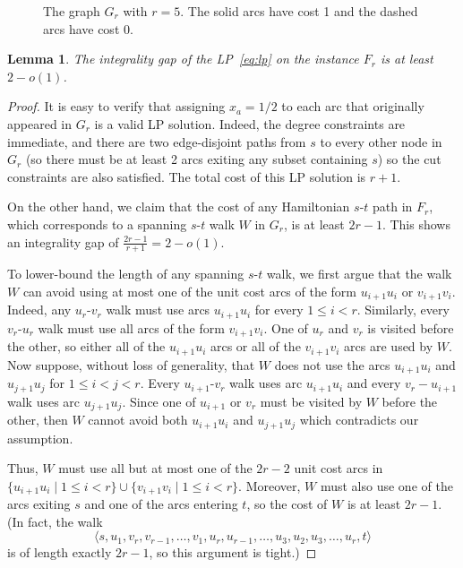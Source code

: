 \documentclass[11pt]{article}
\newtheorem{lemma}[theorem]{Lemma}
\theoremstyle{definition}
\begin{document}
\begin{figure}
 \centering
{}
  \caption{The graph $G_r$ with $r = 5$. The solid arcs have cost 1 and
    the dashed arcs have cost 0.}\label{fig:gap}
\end{figure}

\begin{lemma} \label{lem:intgap}
  The integrality gap of the LP~\ref{eq:lp} on the instance $F_r$ is
  at least $2-o(1)$.
\end{lemma}

\begin{proof}
  It is easy to verify that assigning $x_a = 1/2$ to each arc that originally
  appeared in $G_r$ is a valid LP solution. Indeed, the degree constraints are immediate,
  and there are two edge-disjoint paths from $s$ to every other node in
  $G_r$ (so there must be at least 2 arcs exiting any subset containing $s$)
  so the cut constraints are also satisfied. The total cost of
  this LP solution is $r+1$.

  On the other hand, we claim that the cost of any Hamiltonian $s$-$t$
  path in $F_r$, which corresponds to a spanning $s$-$t$ walk $W$ in
  $G_r$, is at least $2r-1$. This shows an integrality gap of
  $\frac{2r-1}{r+1} = 2 - o(1)$.

  To lower-bound the length of any spanning $s$-$t$ walk, we first argue
  that the walk $W$ can avoid using at most one of the unit cost arcs
  of the form $u_{i+1}u_i$ or $v_{i+1}v_i$. Indeed, any $u_r$-$v_r$ walk
  must use arcs $u_{i+1}u_i$ for every $1 \leq i < r$. Similarly, every
  $v_r$-$u_r$ walk must use all arcs of the form $v_{i+1}v_i$. One of
  $u_r$ and $v_r$ is visited before the other, so either all of the
  $u_{i+1}u_i$ arcs or all of the $v_{i+1}v_i$ arcs are used by
  $W$. Now suppose, without loss of generality, that $W$ does not use
  the arcs $u_{i+1}u_i$ and $u_{j+1}u_j$ for $1 \leq i < j < r$.  Every
  $u_{i+1}$-$v_r$ walk uses arc $u_{i+1}u_i$ and every $v_r-u_{i+1}$
  walk uses arc $u_{j+1}u_j$. Since one of $u_{i+1}$ or $v_r$ must be
  visited by $W$ before the other, then $W$ cannot avoid both
  $u_{i+1}u_i$ and $u_{j+1}u_j$ which contradicts our assumption.

  Thus, $W$ must use all but at most one of the $2r-2$ unit cost arcs
  in $\{u_{i+1}u_i \mid 1 \leq i < r\} \cup \{v_{i+1}v_i \mid 1 \leq i <
  r\}$. Moreover, $W$ must also use one of the arcs exiting $s$ and one
  of the arcs entering $t$, so the cost of $W$ is at least $2r-1$.
  (In fact, the walk
\[ \langle s, u_1, v_r, v_{r-1}, \ldots, v_1, u_r, u_{r-1}, \ldots, u_3, u_2, u_3, \ldots, u_r, t \rangle \]
 is of length exactly $2r-1$, so this argument is tight.)
\end{proof}
\end{document}
